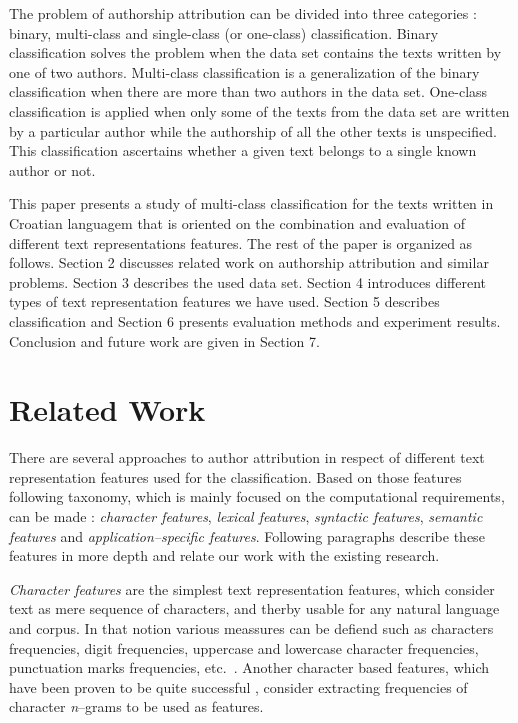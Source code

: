 \documentclass{llncs}
\begin{document}
The problem of authorship attribution can be divided into three categories
\cite{zhao2005effective}: binary, multi-class and single-class (or one-class)
classification. Binary classification solves the problem when the data set
contains the texts written by one of two authors. Multi-class classification is a
generalization of the binary classification when there are more than two authors
in the data set. One-class classification is applied when only some of the texts
from the data set are written by a particular author while the authorship of all
the other texts is unspecified. This classification ascertains whether a given
text belongs to a single known author or not.

This paper presents a study of multi-class classification for the texts written
in Croatian languagem that is oriented on the combination and evaluation of
different text representations features. The rest of the paper is organized as
follows. Section 2 discusses related work on authorship attribution and similar
problems. Section 3 describes the used data set. Section 4 introduces
different types of text representation features we have used. Section 5 describes
classification and Section 6 presents evaluation methods and experiment results. Conclusion and
future work are given in Section 7.

\section{Related Work}
There are several approaches to author attribution in respect of different text
representation features used for the classification. Based on those features
following taxonomy, which is mainly focused on the computational requirements,
can be made \cite{stamatatos2009survey}: \emph{character features},
\emph{lexical features}, \emph{syntactic features}, \emph{semantic features} and
\emph{application--specific features}. Following paragraphs describe these
features in more depth and relate our work with the existing research.

\emph{Character features} are the simplest text representation features, which
consider text as mere sequence of characters, and therby usable for any natural
language and corpus. In that notion various meassures can be defiend such as
characters frequencies, digit frequencies, uppercase and lowercase character
frequencies, punctuation marks frequencies, etc.~\cite{de2001mining}. Another
character based features, which have been proven to be quite successful
\cite{peng2003language,stamatatos2006ensemble}, consider extracting
frequencies of character \emph{n}--grams to be used as features. 
\end{document}
